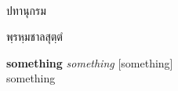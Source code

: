\documentclass[10pt,twoside]{book}
\newcommand{\booktitle}{ปทานุกรม}
\newcommand{\subtitle}{พฺรหฺมชาลสุตฺตํ}
\begin{document}
    \frontmatter
    
    \frontmatter
    \pagestyle{empty}

    \begin{titlepage}
        \centering
        
        ~
        
        \vspace{24pt}
        {\scshape\Huge \booktitle\par}
        \vspace{6pt}
        {\scshape\large \subtitle\par}
    \end{titlepage}
    \cleardoublepage
    

    \mainmatter
    \pagestyle{fancy}

    \needspace{2cm}
    \begin{addmargin}[1.2em]{0em}
        \hspace{-1.2em}\textbf{something} {\textit{something}} [{something}]\\
        {something}\\
    \end{addmargin}
    \par\vspace{0.1em}
\end{document}
